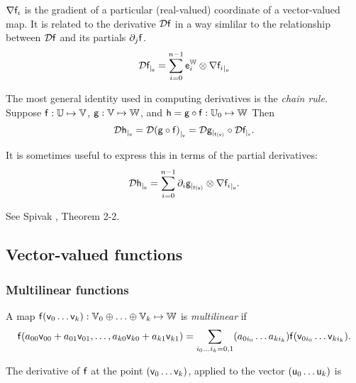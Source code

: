 ${\mathbf \nabla}{\mathsf{f}_i}$ is the gradient of a particular (real-valued) coordinate
of a vector-valued map. It is related to the derivative ${\mathcal{D}{\mathsf{f}}}$
in a way simlilar to the relationship between ${\mathcal{D}{\mathsf{f}}}$ and its partials ${\partial}_{j}{\mathsf{f}}$.
\begin{equation}
{\mathcal{D}{\mathsf{f}}_{\mid_{\mathsf{u}}}} = \sum_{i=0}^{n-1}  \mathsf{e}_i^{\mathbb{W}} \otimes {\mathbf \nabla}{\mathsf{f}_i}_{\mid_{\mathsf{u}}}
\end{equation}

The most general identity used in computing derivatives is the {\it chain rule.}
Suppose
$\mathsf{f}:\mathbb{U} \mapsto \mathbb{V}$,
$\mathsf{g}:\mathbb{V} \mapsto \mathbb{W}$,
and
$\mathsf{h} = \mathsf{g} \circ \mathsf{f} : \mathbb{U}_0 \mapsto \mathbb{W}$
Then
\begin{equation}
\label{eq:chain_rule}
{\mathcal{D}{\mathsf{h}}_{\mid_{\mathsf{u}}}}
=  {\mathcal{D}{(\mathsf{g} \circ \mathsf{f})}_{\mid_{\mathsf{v}}}}
=  {\mathcal{D}{\mathsf{g}}_{\mid_{\mathsf{f}(\mathsf{v})}}}  \circ  {\mathcal{D}{\mathsf{f}}_{\mid_{\mathsf{v}}}}.
\end{equation}

It is sometimes useful to express this in terms of the partial derivatives:
\begin{equation}
\label{eq:chain_rule_partials}
{\mathcal{D}{\mathsf{h}}_{\mid_{\mathsf{u}}}} =  \sum_{i=0}^{n-1} {\partial}_{i}{\mathsf{g}}_{\mid_{\mathsf{f}(\mathsf{u})}} \otimes  {\mathbf \nabla}{\mathsf{f}_i}_{\mid_{\mathsf{u}}}.
\end{equation}

See Spivak \cite{spivak-1965}, Theorem 2-2.



\subsection{Vector-valued functions}


\subsubsection{Multilinear functions}
\label{sec:Multilinear-functions}

A map $\mathsf{f}(\mathsf{v}_0 \ldots \mathsf{v}_k):\mathbb{V}_0 \oplus \ldots \oplus \mathbb{V}_k \mapsto \mathbb{W}$
is {\it multilinear} if
\begin{equation}
\mathsf{f}(a_{00} \mathsf{v}_{00} + a_{01} \mathsf{v}_{01}, \ldots, a_{k0} \mathsf{v}_{k0} + a_{k1} \mathsf{v}_{k1})
 =  \sum_{i_0 \ldots i_k = 0,1} (a_{0i_0} \ldots a_{ki_k}) \mathsf{f}(\mathsf{v}_{0i_0} \ldots \mathsf{v}_{ki_k}).
\end{equation}

The derivative of $\mathsf{f}$
at the point $(\mathsf{v}_0 \ldots \mathsf{v}_k)$, applied to the vector $(\mathsf{u}_0 \ldots \mathsf{u}_k)$ is

